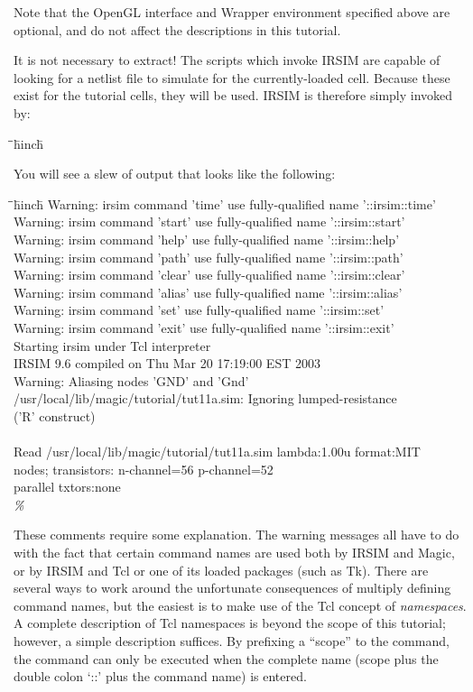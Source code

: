 \documentclass[letterpaper,twoside,12pt]{article}
\def\hinch{\hspace*{0.5in}}
\def\starti{\begin{center}\begin{tabbing}\hinch\=\hinch\=\hinch\=hinch\hinch\=\kill}
\def\endi{\end{tabbing}\end{center}}
\def\ii{\>\>\>}
\def\tf{\ttfamily}
\def\bstf{\bfseries\ttfamily}
\begin{document}
Note that the OpenGL interface and Wrapper environment specified
above are optional, and do not affect the descriptions in this
tutorial.

It is not necessary to extract!  The scripts which invoke IRSIM
are capable of looking for a netlist file to simulate for the
currently-loaded cell.  Because these exist for the tutorial
cells, they will be used.  IRSIM is therefore simply invoked by:

\starti
   \ii {\itshape \% }{\bstf irsim}
\endi

You will see a slew of output that looks like the following:

\starti
  \> \tf Warning: irsim command 'time' use fully-qualified name '::irsim::time' \\
  \> \tf Warning: irsim command 'start' use fully-qualified name '::irsim::start' \\
  \> \tf Warning: irsim command 'help' use fully-qualified name '::irsim::help' \\
  \> \tf Warning: irsim command 'path' use fully-qualified name '::irsim::path' \\
  \> \tf Warning: irsim command 'clear' use fully-qualified name '::irsim::clear' \\
  \> \tf Warning: irsim command 'alias' use fully-qualified name '::irsim::alias' \\
  \> \tf Warning: irsim command 'set' use fully-qualified name '::irsim::set' \\
  \> \tf Warning: irsim command 'exit' use fully-qualified name '::irsim::exit' \\
  \> \tf Starting irsim under Tcl interpreter \\
  \> \tf IRSIM 9.6 compiled on Thu Mar 20 17:19:00 EST 2003 \\
  \> \tf Warning: Aliasing nodes 'GND' and 'Gnd' \\
  \> \tf /usr/local/lib/magic/tutorial/tut11a.sim: Ignoring lumped-resistance \\
  \>\> \tf ('R' construct) \\ \\
  \> \tf Read /usr/local/lib/magic/tutorial/tut11a.sim lambda:1.00u format:MIT \\
  \> \tf 68 nodes; transistors: n-channel=56 p-channel=52 \\
  \> \tf parallel txtors:none \\
  \> {\itshape \% }
\endi

These comments require some explanation.  The warning messages all have to do
with the fact that certain command names are used both by IRSIM and Magic, or
by IRSIM and Tcl or one of its loaded packages (such as Tk).  There are
several ways to work around the unfortunate consequences of multiply defining
command names, but the easiest is to make use of the Tcl concept of
{\itshape namespaces}.  A complete description of Tcl namespaces is beyond
the scope of this tutorial;  however, a simple description suffices.  By
prefixing a ``scope'' to the command, the command can only be executed when
the complete name (scope plus the double colon `::' plus the command name)
is entered.
\end{document}
